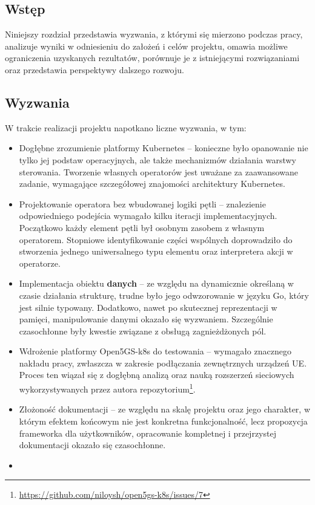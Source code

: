 \subsection{Wstęp}
Niniejszy rozdział przedstawia wyzwania, z którymi się mierzono podczas pracy, analizuje wyniki w odniesieniu do założeń i celów projektu, omawia możliwe ograniczenia uzyskanych rezultatów, porównuje je z istniejącymi rozwiązaniami oraz przedstawia perspektywy dalszego rozwoju.

\subsection{Wyzwania}

W trakcie realizacji projektu napotkano liczne wyzwania, w tym:
\begin{itemize}
    \item Dogłębne zrozumienie platformy Kubernetes – konieczne było opanowanie nie tylko jej podstaw operacyjnych, ale także mechanizmów działania warstwy sterowania. Tworzenie własnych operatorów jest uważane za zaawansowane zadanie, wymagające szczegółowej znajomości architektury Kubernetes.
    \item Projektowanie operatora bez wbudowanej logiki pętli – znalezienie odpowiedniego podejścia wymagało kilku iteracji implementacyjnych. Początkowo każdy element pętli był osobnym zasobem z własnym operatorem. Stopniowe identyfikowanie części wspólnych doprowadziło do stworzenia jednego uniwersalnego typu elementu oraz interpretera akcji w operatorze.
    \item Implementacja obiektu \textbf{danych} – ze względu na dynamicznie określaną w czasie działania strukturę, trudne było jego odwzorowanie w języku Go, który jest silnie typowany. Dodatkowo, nawet po skutecznej reprezentacji w pamięci, manipulowanie danymi okazało się wyzwaniem. Szczególnie czasochłonne były kwestie związane z obsługą zagnieżdżonych pól.
    \item Wdrożenie platformy Open5GS-k8s do testowania – wymagało znacznego nakładu pracy, zwłaszcza w zakresie podłączania zewnętrznych urządzeń UE. Proces ten wiązał się z dogłębną analizą oraz nauką rozszerzeń sieciowych wykorzystywanych przez autora repozytorium\footnote{\url{https://github.com/niloysh/open5gs-k8s/issues/7}}.
    \item Złożoność dokumentacji – ze względu na skalę projektu oraz jego charakter, w którym efektem końcowym nie jest konkretna funkcjonalność, lecz propozycja frameworka dla użytkowników, opracowanie kompletnej i przejrzystej dokumentacji okazało się czasochłonne.
    \item 
\end{itemize}

